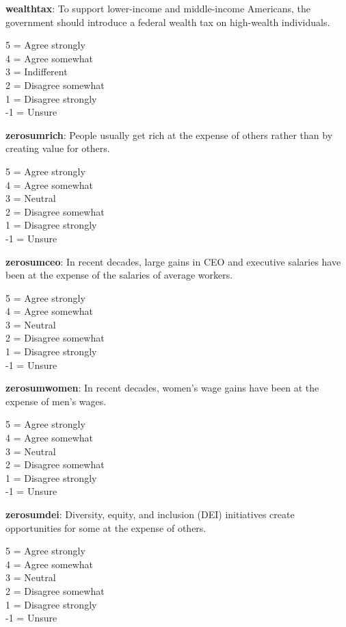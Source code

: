 \documentclass[11pt, headsepline]{article}
\begin{document}
\textbf{wealthtax}: To support lower-income and middle-income Americans, the government should introduce a federal wealth tax on high-wealth individuals.

5 = Agree strongly \\
4 = Agree somewhat \\
3 = Indifferent \\
2 = Disagree somewhat \\
1 = Disagree strongly \\
-1 = Unsure

\textbf{zerosumrich}: People usually get rich at the expense of others rather than by creating value for others.

5 = Agree strongly \\
4 = Agree somewhat \\
3 = Neutral \\
2 = Disagree somewhat \\
1 = Disagree strongly \\
-1 = Unsure

\textbf{zerosumceo}: In recent decades, large gains in CEO and executive salaries have been at the expense of the salaries of average workers.

5 = Agree strongly \\
4 = Agree somewhat \\
3 = Neutral \\
2 = Disagree somewhat \\
1 = Disagree strongly \\
-1 = Unsure

\textbf{zerosumwomen}: In recent decades, women’s wage gains have been at the expense of men’s wages.

5 = Agree strongly \\
4 = Agree somewhat \\
3 = Neutral \\
2 = Disagree somewhat \\
1 = Disagree strongly \\
-1 = Unsure

\textbf{zerosumdei}: Diversity, equity, and inclusion (DEI) initiatives create opportunities for some at the expense of others.

5 = Agree strongly \\
4 = Agree somewhat \\
3 = Neutral \\
2 = Disagree somewhat \\
1 = Disagree strongly \\
-1 = Unsure
\end{document}

